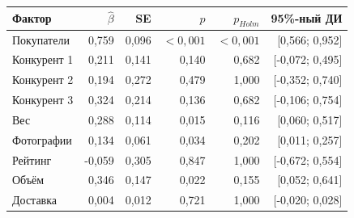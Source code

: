 \begin{tabular}{lrrrrr}
\toprule
Фактор & $\widehat\beta$ & SE & $p$ & $p_{Holm}$ & 95\%-ный ДИ \\
\midrule
Покупатели & 0,759 & 0,096 & $<0{,}001$ & $<0{,}001$ & [0,566; 0,952] \\
Конкурент 1 & 0,211 & 0,141 & 0,140 & 0,682 & [-0,072; 0,495] \\
Конкурент 2 & 0,194 & 0,272 & 0,479 & 1,000 & [-0,352; 0,740] \\
Конкурент 3 & 0,324 & 0,214 & 0,136 & 0,682 & [-0,106; 0,754] \\
Вес & 0,288 & 0,114 & 0,015 & 0,116 & [0,060; 0,517] \\
Фотографии & 0,134 & 0,061 & 0,034 & 0,202 & [0,011; 0,257] \\
Рейтинг & -0,059 & 0,305 & 0,847 & 1,000 & [-0,672; 0,554] \\
Объём & 0,346 & 0,147 & 0,022 & 0,155 & [0,052; 0,641] \\
Доставка & 0,004 & 0,012 & 0,721 & 1,000 & [-0,020; 0,028] \\
\bottomrule
\end{tabular}
